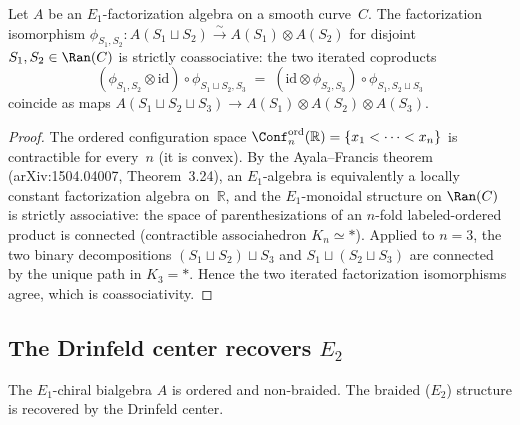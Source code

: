 \begin{proposition}
\label{prop:coassoc-ran-e1}
Let $A$ be an $E_1$-factorization algebra on a smooth curve~$C$.
The factorization isomorphism
$\phi_{S_1,S_2}\colon A(S_1 \sqcup S_2) \xrightarrow{\sim}
A(S_1) \otimes A(S_2)$
for disjoint $S_1, S_2 \in \Ran(C)$ is strictly coassociative:
the two iterated coproducts
\[
 ({\phi_{S_1,S_2} \otimes \mathrm{id}}) \circ \phi_{S_1 \sqcup S_2, S_3}
 \;=\;
 ({\mathrm{id} \otimes \phi_{S_2,S_3}}) \circ \phi_{S_1, S_2 \sqcup S_3}
\]
coincide as maps $A(S_1 \sqcup S_2 \sqcup S_3) \to
A(S_1) \otimes A(S_2) \otimes A(S_3)$.
\end{proposition}

\begin{proof}
The ordered configuration space
$\Conf_n^{\mathrm{ord}}(\mathbb{R})
= \{x_1 < \cdots < x_n\}$
is contractible for every~$n$ (it is convex).
By the Ayala--Francis theorem
(arXiv:1504.04007, Theorem~3.24),
an $E_1$-algebra is equivalently a locally constant
factorization algebra on~$\mathbb{R}$,
and the $E_1$-monoidal structure on $\Ran(C)$
is strictly associative: the space of parenthesizations
of an $n$-fold labeled-ordered product is connected
(contractible associahedron $K_n \simeq \ast$).
Applied to $n = 3$, the two binary decompositions
$(S_1 \sqcup S_2) \sqcup S_3$ and
$S_1 \sqcup (S_2 \sqcup S_3)$
are connected by the unique path in $K_3 = \ast$.
Hence the two iterated factorization isomorphisms
agree, which is coassociativity.
\end{proof}

\subsection{The Drinfeld center recovers \texorpdfstring{$E_2$}{E-2}}
\label{subsec:drinfeld-recovers-e2}

The $E_1$-chiral bialgebra $A$ is ordered and non-braided. The braided
($E_2$) structure is recovered by the Drinfeld center.


